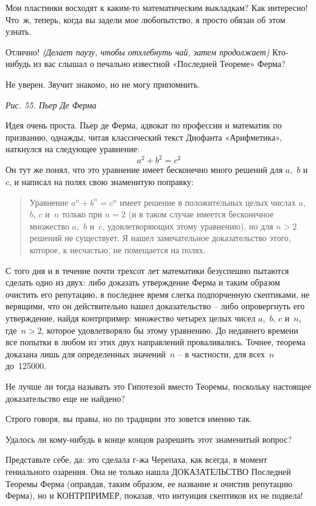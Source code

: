 \documentclass[../main.tex]{subfiles}
\begin{document}
\begin{dialogue}
 Мои пластинки восходят к каким-то математическим выкладкам? Как интересно! Что~ж, теперь, когда вы задели мое любопытство, я просто обязан об этом узнать.

 Отлично! \emph{(Делает паузу, чтобы отхлебнуть чай, затем продолжает)} Кто-нибудь из вас слышал о печально известной «Последней Теореме» Ферма?

 Не уверен. Звучит знакомо, но не могу припомнить.

\emph{Рис. 55. Пьер Де Ферма}

 Идея очень проста. Пьер де Ферма, адвокат по профессии и математик по призванию, однажды, читая классический текст Диофанта «Арифметика», наткнулся на следующее уравнение:
\[
    a^2 + b^2 = c^2
\]
Он тут же понял, что это уравнение имеет бесконечно много решений для $a$,~$b$ и~$c$, и написал на полях свою знаменитую поправку:

\begin{quote}
    Уравнение $a^n + b^n = c^n$ имеет решение в положительных целых числах $a$,~$b$, $c$ и~$n$ только при $n = 2$ (и в таком случае имеется бесконечное множество $a$,~$b$ и~$c$, удовлетворяющих этому уравнению), но для $n > 2$ решений не существует. Я нашел замечательное доказательство этого, которое, к несчастью, не помещается на полях.
\end{quote}

С того дня и в течение почти трехсот лет математики безуспешно пытаются сделать одно из двух: либо доказать утверждение Ферма и таким образом очистить его репутацию, в последнее время слегка подпорченную скептиками, не верящими, что он действительно нашел доказательство \--- либо опровергнуть его утверждение, найдя контрпример: множество четырех целых чисел $a$,~$b$, $c$ и~$n$, где~$n > 2$, которое удовлетворяло бы этому уравнению. До недавнего времени все попытки в любом из этих двух направлений проваливались. Точнее, теорема доказана лишь для определенных значений~$n$ \--- в частности, для всех~$n$ до~\num{125000}.

 Не лучше ли тогда называть это Гипотезой вместо Теоремы, поскольку настоящее доказательство еще не найдено?

 Строго говоря, вы правы, но по традиции это зовется именно так.

 Удалось ли кому-нибудь в конце концов разрешить этот знаменитый вопрос?

 Представьте себе, да: это сделала г-жа Черепаха, как всегда, в момент гениального озарения. Она не только нашла ДОКАЗАТЕЛЬСТВО Последней Теоремы Ферма (оправдав, таким образом, ее название и очистив репутацию Ферма), но и КОНТРПРИМЕР, показав, что интуиция скептиков их не подвела!


\end{dialogue}
\end{document}
